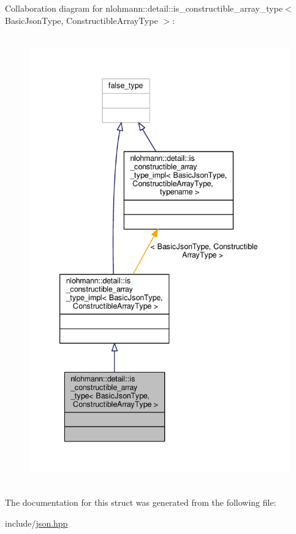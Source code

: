 Collaboration diagram for nlohmann\+:\+:detail\+:\+:is\+\_\+constructible\+\_\+array\+\_\+type$<$ Basic\+Json\+Type, Constructible\+Array\+Type $>$\+:
\nopagebreak
\begin{figure}[H]
\begin{center}
\leavevmode
\includegraphics[height=550pt]{structnlohmann_1_1detail_1_1is__constructible__array__type__coll__graph}
\end{center}
\end{figure}


The documentation for this struct was generated from the following file\+:\begin{DoxyCompactItemize}
\item 
include/\hyperlink{json_8hpp}{json.\+hpp}\end{DoxyCompactItemize}
